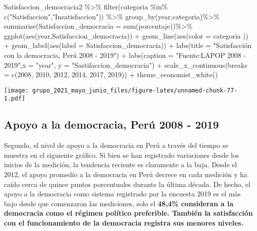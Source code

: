 \documentclass[
]{book}
\newenvironment{Shaded}{\begin{snugshade}}{\end{snugshade}}
\newcommand{\AttributeTok}[1]{\textcolor[rgb]{0.77,0.63,0.00}{#1}}
\newcommand{\DecValTok}[1]{\textcolor[rgb]{0.00,0.00,0.81}{#1}}
\newcommand{\FunctionTok}[1]{\textcolor[rgb]{0.00,0.00,0.00}{#1}}
\newcommand{\NormalTok}[1]{#1}
\newcommand{\SpecialCharTok}[1]{\textcolor[rgb]{0.00,0.00,0.00}{#1}}
\newcommand{\StringTok}[1]{\textcolor[rgb]{0.31,0.60,0.02}{#1}}
\begin{document}
\begin{Shaded}
\begin{Highlighting}[]
\NormalTok{Satisfaccion\_democracia2 }\SpecialCharTok{\%\textgreater{}\%}
  \FunctionTok{filter}\NormalTok{(categoria }\SpecialCharTok{\%in\%} \FunctionTok{c}\NormalTok{(}\StringTok{"Satisfaccion"}\NormalTok{,}\StringTok{"Insatisfaccion"}\NormalTok{)) }\SpecialCharTok{\%\textgreater{}\%} 
  \FunctionTok{group\_by}\NormalTok{(year,categoria)}\SpecialCharTok{\%\textgreater{}\%}
  \FunctionTok{summarise}\NormalTok{(}\AttributeTok{Satisfaccion\_democracia =} \FunctionTok{sum}\NormalTok{(porcentaje))}\SpecialCharTok{\%\textgreater{}\%}
  \FunctionTok{ggplot}\NormalTok{(}\FunctionTok{aes}\NormalTok{(year,Satisfaccion\_democracia)) }\SpecialCharTok{+} 
  \FunctionTok{geom\_line}\NormalTok{(}\FunctionTok{aes}\NormalTok{(}\AttributeTok{color =}\NormalTok{ categoria )) }\SpecialCharTok{+}
  \FunctionTok{geom\_label}\NormalTok{(}\FunctionTok{aes}\NormalTok{(}\AttributeTok{label =}\NormalTok{ Satisfaccion\_democracia)) }\SpecialCharTok{+}
  \FunctionTok{labs}\NormalTok{(}\AttributeTok{title =} \StringTok{"Satisfacción con la democracia, Perú 2008 {-} 2019"}\NormalTok{) }\SpecialCharTok{+}
  \FunctionTok{labs}\NormalTok{(}\AttributeTok{caption =} \StringTok{"Fuente:LAPOP 2008 {-} 2019"}\NormalTok{,}\AttributeTok{x =} \StringTok{"year"}\NormalTok{, }\AttributeTok{y =} \StringTok{"Sastifaccion\_democracia"}\NormalTok{) }\SpecialCharTok{+}
  \FunctionTok{scale\_x\_continuous}\NormalTok{(}\AttributeTok{breaks =} \FunctionTok{c}\NormalTok{(}\DecValTok{2008}\NormalTok{, }\DecValTok{2010}\NormalTok{, }\DecValTok{2012}\NormalTok{, }\DecValTok{2014}\NormalTok{, }\DecValTok{2017}\NormalTok{, }\DecValTok{2019}\NormalTok{)) }\SpecialCharTok{+}
  \FunctionTok{theme\_economist\_white}\NormalTok{()}
\end{Highlighting}
\end{Shaded}

\texttt{[image: grupo\_2021\_mayo\_junio\_files/figure-latex/unnamed-chunk-77-1.pdf]}

\hypertarget{apoyo-a-la-democracia-peruxfa-2008---2019}{%
\subsection{Apoyo a la democracia, Perú 2008 - 2019}\label{apoyo-a-la-democracia-peruxfa-2008---2019}}

Segundo, el nivel de apoyo a la democracia en Perú a través del tiempo se muestra en el siguiente gráfico. Si bien se han registrado variaciones desde los inicios de la medición, la tendencia reciente es claramente a la baja. Desde el 2012, el apoyo promedio a la democracia en Perú decrece en cada medición y ha caído cerca de quince puntos porcentuales durante la última década. De hecho, el apoyo a la democracia como sistema registrado por la encuesta 2019 es el más bajo desde que comenzaron las mediciones, solo el \textbf{48,4\% consideran a la democracia como el régimen político preferible. También la satisfacción con el funcionamiento de la democracia registra sus menores niveles.}
\end{document}
